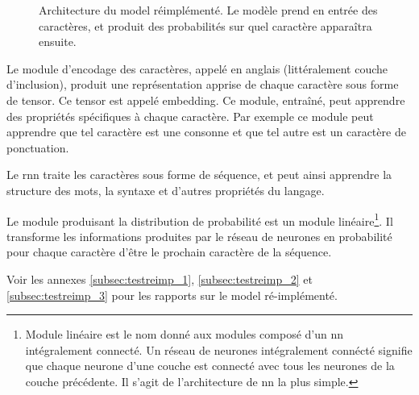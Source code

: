\begin{figure}[h]
	\centering
	\scalebox{1}{}
	\caption[Architecture du  réimplémenté]{Architecture du \gls{model} réimplémenté. Le modèle prend en entrée des caractères, et produit des probabilités sur quel caractère apparaîtra ensuite.}
	\label{fig:reimplement}
\end{figure}

Le module d'encodage des caractères, appelé  en anglais (littéralement \og couche d'inclusion\fg{}), produit une représentation apprise de chaque caractère sous forme de \gls{tensor}. Ce \gls{tensor} est appelé \gls{embedding}. Ce module, entraîné, peut apprendre des propriétés spécifiques à chaque caractère. Par exemple ce module peut apprendre que tel caractère est une consonne et que tel autre est un caractère de ponctuation. \label{def:embeding}

Le \gls{rnn} traite les caractères sous forme de séquence, et peut ainsi apprendre la structure des mots, la syntaxe et d'autres propriétés du langage.

Le module produisant la distribution de probabilité est un module linéaire\footnote{\og Module linéaire \fg{} est le nom donné aux modules composé d'un \gls{nn} intégralement connecté. Un réseau de neurones intégralement connécté signifie que chaque neurone d'une couche est connecté avec tous les neurones de la couche précédente. Il s'agit de l'architecture de \gls{nn} la plus simple.\label{def:fully_connected}\label{def:lin_module}}.
Il transforme les informations produites par le réseau de neurones en probabilité pour chaque caractère d'être le prochain caractère de la séquence.

Voir les annexes \ref{subsec:testreimp_1}, \ref{subsec:testreimp_2} et \ref{subsec:testreimp_3} pour les rapports sur le \gls{model} ré-implémenté. 
%
